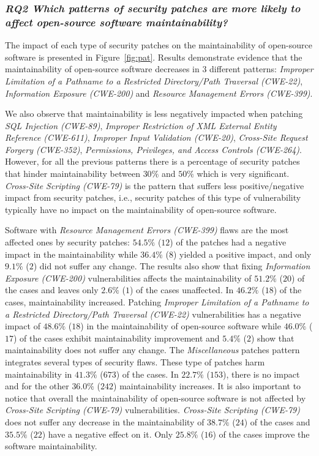 \documentclass[10pt,conference]{IEEEtran}
\begin{document}
\subsubsection*{\textit{\textbf{RQ2} \textbf{Which patterns of security patches are more likely to
affect open-source software maintainability?}}}

The impact of each type of security patches on the maintainability of
open-source software is presented in Figure~\ref{fig:pat}. Results demonstrate evidence that the maintainability of open-source software decreases in $3$ different patterns: \emph{Improper Limitation of a Pathname to a Restricted Directory/Path Traversal (CWE-22)}, \emph{Information Exposure (CWE-200)} and \emph{Resource Management Errors (CWE-399)}.

We also observe that maintainability is less
negatively impacted when patching \emph{SQL Injection (CWE-89)}, \emph{Improper Restriction of XML External Entity Reference (CWE-611)}, \emph{Improper Input Validation (CWE-20)}, \emph{Cross-Site Request Forgery (CWE-352)}, \emph{Permissions, Privileges, and Access Controls (CWE-264)}. However,
for all the previous patterns there is a percentage of security patches that hinder maintainability between $30\%$ and $50\%$ which is very significant. \emph{Cross-Site Scripting (CWE-79)} is the pattern that suffers less positive/negative impact from security patches, i.e., security
patches of this type of vulnerability typically have no impact on the maintainability of open-source software. 

Software with \emph{Resource Management Errors (CWE-399)} flaws are the most affected ones by security patches: $54.5\%$ ($12$) of the patches had a negative impact
in the maintainability while $36.4\%$ ($8$) yielded a positive impact, and only
$9.1\%$ ($2$) did not suffer any change. The results also show that fixing
\emph{Information Exposure (CWE-200)} vulnerabilities affects the maintainability of $51.2\%$ ($20$) of the cases
and leaves only $2.6\%$ ($1$) of the cases unaffected. In $46.2\%$ ($18$) of the
cases, maintainability increased. 
Patching \emph{Improper Limitation of a Pathname to a Restricted Directory/Path Traversal (CWE-22)} vulnerabilities has a negative
impact of $48.6\%$ ($18$) in the maintainability of open-source software while
$46.0\%$ ($17$) of the cases exhibit maintainability improvement and $5.4\%$
($2$) show that maintainability does not suffer any change. The
\emph{Miscellaneous} patches pattern integrates several types of security
flaws. These type of patches harm maintainability in $41.3\%$ ($673$) of the
cases. In $22.7\%$ ($153$), there is no impact and for the
other $36.0\%$ ($242$) maintainability increases.
It is also important to notice that overall the maintainability of open-source
software is not affected by \emph{Cross-Site Scripting (CWE-79)} vulnerabilities. \emph{Cross-Site Scripting (CWE-79)}
does not suffer any decrease in the maintainability of $38.7\%$ ($24$) of the cases
and $35.5\%$ ($22$) have a negative effect on it. Only $25.8\%$ ($16$) of the
cases improve the software maintainability. 
\end{document}
